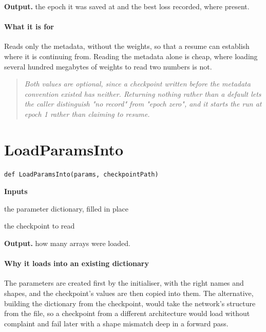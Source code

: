 \noindent\textbf{Output.} the epoch it was saved at and the best loss recorded, where present.


\paragraph{What it is for}
Reads only the metadata, without the weights, so that a resume can establish where it is continuing from. Reading the metadata alone is cheap, where loading several hundred megabytes of weights to read two numbers is not.


\begin{quote}\small\itshape Both values are optional, since a checkpoint written before the metadata convention existed has neither. Returning nothing rather than a default lets the caller distinguish "no record" from "epoch zero", and it starts the run at epoch 1 rather than claiming to resume.\end{quote}

\section{LoadParamsInto}
\begin{lstlisting}[style=sig]
def LoadParamsInto(params, checkpointPath)
\end{lstlisting}

\noindent\textbf{Inputs}
\begin{description}[leftmargin=2.2em,style=nextline,font=\normalfont\ttfamily]\setlength\itemsep{1pt}
  \item[{params}] \normalfont the parameter dictionary, filled in place
  \item[{checkpointPath}] \normalfont the checkpoint to read
\end{description}

\noindent\textbf{Output.} how many arrays were loaded.


\paragraph{Why it loads into an existing dictionary}
The parameters are created first by the initialiser, with the right names and shapes, and the checkpoint's values are then copied into them. The alternative, building the dictionary from the checkpoint, would take the network's structure from the file, so a checkpoint from a different architecture would load without complaint and fail later with a shape mismatch deep in a forward pass.


